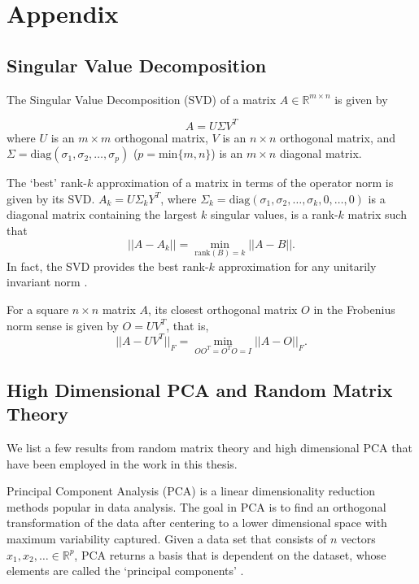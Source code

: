 \chapter{Appendix}
\section{Singular Value Decomposition}
The Singular Value Decomposition (SVD) of a matrix $A\in \mathbb{R}^{m\times n}$ is given by

\begin{equation}
A=U\Sigma V^T
\end{equation}
where $U$ is an $m \times m$ orthogonal matrix, $V$ is an $n \times n$ orthogonal matrix, and $\Sigma=\text{diag}(\sigma_1,\sigma_2,\ldots,\sigma_p)$ ($p=\text{min}\{m,n\}$) is an $m \times n$ diagonal matrix.

The `best' rank-$k$ approximation of a matrix in terms of the operator norm is given by its SVD. $A_k=U\Sigma_k Y^T$, where $\Sigma_k=\text{diag}(\sigma_1,\sigma_2,\ldots,\sigma_k,0,\ldots,0)$ is a diagonal matrix containing the largest $k$ singular values, is a rank-$k$ matrix such that
\begin{equation}
||A-A_k|| = \min_{\text{rank}(B)=k} ||A-B||.
\end{equation}
In fact, the SVD provides the best rank-$k$ approximation for any unitarily invariant norm \cite{matrixanal}.

For a square $n \times n$ matrix $A$, its closest orthogonal matrix $O$ in the Frobenius norm sense \cite{Keller1975} is given by $O=UV^T$, that is,
\begin{equation}
||A-UV^T||_F = \min_{OO^T=O^TO=I}||A-O||_F.
\end{equation}

\section{High Dimensional PCA and Random Matrix Theory}
We list a few results from random matrix theory and high dimensional PCA that have been employed in the work in this thesis.

Principal Component Analysis (PCA) is a linear dimensionality reduction methods popular in data analysis. The goal in PCA is to find an orthogonal transformation of the data after centering to a lower dimensional space with maximum variability captured. Given a data set that consists of $n$ vectors $x_1, x_2, \dots \in \mathbb{R}^p$, PCA returns a basis that is dependent on the dataset, whose elements are called the `principal components' \cite{Han2000DataMC}.

